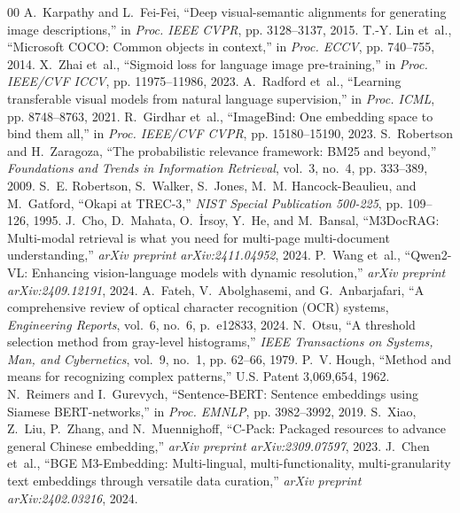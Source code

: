 \begin{thebibliography}{00}
A.~Karpathy and L.~Fei-Fei, ``Deep visual-semantic alignments for generating image descriptions,'' in \emph{Proc. IEEE CVPR}, pp. 3128--3137, 2015.
T.-Y. Lin et~al., ``Microsoft COCO: Common objects in context,'' in \emph{Proc. ECCV}, pp. 740--755, 2014.
X.~Zhai et~al., ``Sigmoid loss for language image pre-training,'' in \emph{Proc. IEEE/CVF ICCV}, pp. 11975--11986, 2023.
A.~Radford et~al., ``Learning transferable visual models from natural language supervision,'' in \emph{Proc. ICML}, pp. 8748--8763, 2021.
R.~Girdhar et~al., ``ImageBind: One embedding space to bind them all,'' in \emph{Proc. IEEE/CVF CVPR}, pp. 15180--15190, 2023.
S.~Robertson and H.~Zaragoza, ``The probabilistic relevance framework: BM25 and beyond,'' \emph{Foundations and Trends in Information Retrieval}, vol.~3, no.~4, pp. 333--389, 2009.
S.~E. Robertson, S.~Walker, S.~Jones, M.~M. Hancock-Beaulieu, and M.~Gatford, ``Okapi at TREC-3,'' \emph{NIST Special Publication 500-225}, pp. 109--126, 1995.
J.~Cho, D.~Mahata, O.~{\.I}rsoy, Y.~He, and M.~Bansal, ``M3DocRAG: Multi-modal retrieval is what you need for multi-page multi-document understanding,'' \emph{arXiv preprint arXiv:2411.04952}, 2024.
P.~Wang et~al., ``Qwen2-VL: Enhancing vision-language models with dynamic resolution,'' \emph{arXiv preprint arXiv:2409.12191}, 2024.
A.~Fateh, V.~Abolghasemi, and G.~Anbarjafari, ``A comprehensive review of optical character recognition (OCR) systems, \emph{Engineering Reports}, vol.~6, no.~6, p.~e12833, 2024.
N.~Otsu, ``A threshold selection method from gray-level histograms,'' \emph{IEEE Transactions on Systems, Man, and Cybernetics}, vol.~9, no.~1, pp. 62--66, 1979.
P.~V. Hough, ``Method and means for recognizing complex patterns,'' U.S. Patent 3,069,654, 1962.
N.~Reimers and I.~Gurevych, ``Sentence-BERT: Sentence embeddings using Siamese BERT-networks,'' in \emph{Proc. EMNLP}, pp. 3982--3992, 2019.
S.~Xiao, Z.~Liu, P.~Zhang, and N.~Muennighoff, ``C-Pack: Packaged resources to advance general Chinese embedding,'' \emph{arXiv preprint arXiv:2309.07597}, 2023.
J.~Chen et~al., ``BGE M3-Embedding: Multi-lingual, multi-functionality, multi-granularity text embeddings through versatile data curation,'' \emph{arXiv preprint arXiv:2402.03216}, 2024.

\end{thebibliography}
